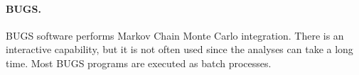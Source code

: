 \documentclass{article}
\newcommand{\stexttt}[1]{{\small\texttt{#1}}}
\begin{document}



 
\paragraph{BUGS.}
\label{sec:bugs-batch}
  
BUGS software performs Markov Chain Monte Carlo integration.  There is
an interactive capability, but it is not often used since the analyses
can take a long time.  Most BUGS programs are executed as batch
processes.
\end{document}
